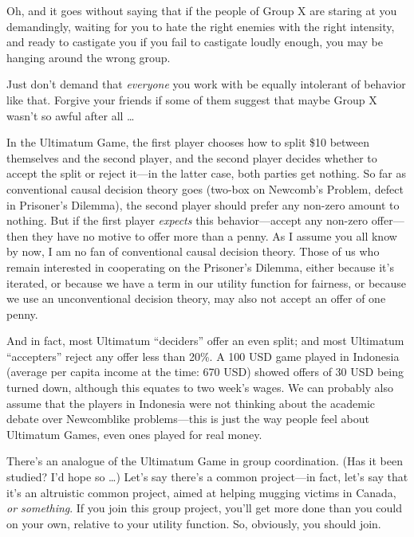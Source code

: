 {
 Oh, and it goes without saying that if the people of Group X are
staring at you demandingly, waiting for you to hate the right enemies
with the right intensity, and ready to castigate you if you fail to
castigate loudly enough, you may be hanging around the wrong group.}

{
 Just don't demand that \textit{everyone} you work
with be equally intolerant of behavior like that. Forgive your friends
if some of them suggest that maybe Group X wasn't so
awful after all \ldots}

\myendsectiontext


{
 In the Ultimatum Game, the first player chooses how to split \$10
between themselves and the second player, and the second player decides
whether to accept the split or reject it---in the latter case, both
parties get nothing. So far as conventional causal decision theory goes
(two-box on Newcomb's Problem, defect in
Prisoner's Dilemma), the second player should prefer
any non-zero amount to nothing. But if the first player
\textit{expects} this behavior---accept any non-zero offer---then they
have no motive to offer more than a penny. As I assume you all know by
now, I am no fan of conventional causal decision theory. Those of us
who remain interested in cooperating on the Prisoner's
Dilemma, either because it's iterated, or because we
have a term in our utility function for fairness, or because we use an
unconventional decision theory, may also not accept an offer of one
penny. }

{
 And in fact, most Ultimatum
``deciders'' offer an even split;
and most Ultimatum ``accepters''
reject any offer less than 20\%. A 100 USD game played in Indonesia
(average per capita income at the time: 670 USD) showed offers of 30
USD being turned down, although this equates to two
week's wages. We can probably also assume that the
players in Indonesia were not thinking about the academic debate over
Newcomblike problems---this is just the way people feel about Ultimatum
Games, even ones played for real money.}

{
 There's an analogue of the Ultimatum Game in group
coordination. (Has it been studied? I'd hope so \ldots)
Let's say there's a common project---in
fact, let's say that it's an altruistic
common project, aimed at helping mugging victims in Canada, \textit{or
something}. If you join this group project, you'll get
more done than you could on your own, relative to your utility
function. So, obviously, you should join.}

